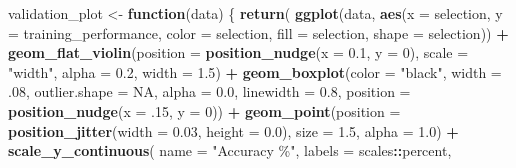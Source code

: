 \documentclass[
]{book}
\newenvironment{Shaded}{\begin{snugshade}}{\end{snugshade}}
\newcommand{\AttributeTok}[1]{\textcolor[rgb]{0.13,0.29,0.53}{#1}}
\newcommand{\ConstantTok}[1]{\textcolor[rgb]{0.56,0.35,0.01}{#1}}
\newcommand{\ControlFlowTok}[1]{\textcolor[rgb]{0.13,0.29,0.53}{\textbf{#1}}}
\newcommand{\DecValTok}[1]{\textcolor[rgb]{0.00,0.00,0.81}{#1}}
\newcommand{\FloatTok}[1]{\textcolor[rgb]{0.00,0.00,0.81}{#1}}
\newcommand{\FunctionTok}[1]{\textcolor[rgb]{0.13,0.29,0.53}{\textbf{#1}}}
\newcommand{\NormalTok}[1]{#1}
\newcommand{\OtherTok}[1]{\textcolor[rgb]{0.56,0.35,0.01}{#1}}
\newcommand{\SpecialCharTok}[1]{\textcolor[rgb]{0.81,0.36,0.00}{\textbf{#1}}}
\newcommand{\StringTok}[1]{\textcolor[rgb]{0.31,0.60,0.02}{#1}}
\begin{document}
\begin{Shaded}
\begin{Highlighting}[]
\NormalTok{validation\_plot }\OtherTok{\textless{}{-}} \ControlFlowTok{function}\NormalTok{(data) \{ }\FunctionTok{return}\NormalTok{(}
    \FunctionTok{ggplot}\NormalTok{(data,}
    \FunctionTok{aes}\NormalTok{(}\AttributeTok{x =}\NormalTok{ selection, }\AttributeTok{y =}\NormalTok{ training\_performance, }\AttributeTok{color =}\NormalTok{ selection,}
                \AttributeTok{fill =}\NormalTok{ selection, }\AttributeTok{shape =}\NormalTok{ selection)) }\SpecialCharTok{+}
    \FunctionTok{geom\_flat\_violin}\NormalTok{(}\AttributeTok{position =} \FunctionTok{position\_nudge}\NormalTok{(}\AttributeTok{x =} \FloatTok{0.1}\NormalTok{, }\AttributeTok{y =} \DecValTok{0}\NormalTok{),}
                    \AttributeTok{scale =} \StringTok{"width"}\NormalTok{, }\AttributeTok{alpha =} \FloatTok{0.2}\NormalTok{, }\AttributeTok{width =} \FloatTok{1.5}\NormalTok{) }\SpecialCharTok{+}
    \FunctionTok{geom\_boxplot}\NormalTok{(}\AttributeTok{color =} \StringTok{"black"}\NormalTok{, }\AttributeTok{width =}\NormalTok{ .}\DecValTok{08}\NormalTok{, }\AttributeTok{outlier.shape =} \ConstantTok{NA}\NormalTok{,}
                \AttributeTok{alpha =} \FloatTok{0.0}\NormalTok{, }\AttributeTok{linewidth =} \FloatTok{0.8}\NormalTok{,}
                \AttributeTok{position =} \FunctionTok{position\_nudge}\NormalTok{(}\AttributeTok{x =}\NormalTok{ .}\DecValTok{15}\NormalTok{, }\AttributeTok{y =} \DecValTok{0}\NormalTok{)) }\SpecialCharTok{+}
    \FunctionTok{geom\_point}\NormalTok{(}\AttributeTok{position =} \FunctionTok{position\_jitter}\NormalTok{(}\AttributeTok{width =} \FloatTok{0.03}\NormalTok{,}
                \AttributeTok{height =} \FloatTok{0.0}\NormalTok{), }\AttributeTok{size =} \FloatTok{1.5}\NormalTok{, }\AttributeTok{alpha =} \FloatTok{1.0}\NormalTok{) }\SpecialCharTok{+}
    \FunctionTok{scale\_y\_continuous}\NormalTok{(}
    \AttributeTok{name =} \StringTok{"Accuracy \%"}\NormalTok{,}
    \AttributeTok{labels =}\NormalTok{ scales}\SpecialCharTok{::}\NormalTok{percent,}


\end{Highlighting}
\end{Shaded}
\end{document}
